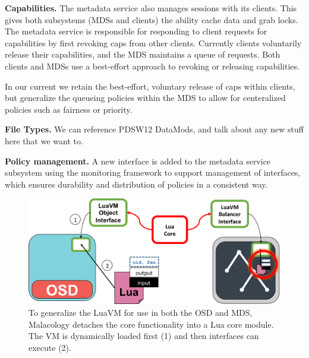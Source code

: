 \documentclass[10pt,twocolumn]{article}
\begin{document}
{\bf Capabilities.}
The metadata service also manages sessions with its clients. This gives both
subsystems (MDSs and clients) the ability cache data and grab locks. The
metadata service is responsible for responding to client requests for
capabilities by first revoking caps from other clients. Currently clients
voluntarily release their capabilities, and the MDS maintains a queue of
requests.  Both clients and MDSs use a best-effort approach to revoking or
releasing capabilities.

In our current we retain the best-effort, voluntary release of caps within
clients, but generalize the queueing policies within the MDS to allow for
centeralized policies such as fairness or priority.

{\bf File Types.}
We can reference PDSW12 DataMods, and talk about any new stuff here that we
want to.

{\bf Policy management.} A new interface is added to the metadata service
subsystem using the monitoring framework to support management of interfaces,
which ensures durability and distribution of policies in a consistent way.

\begin{figure}[h]
\centering
\includegraphics{figures/cls-osd-mds.png}
\caption{To generalize the LuaVM for use in both the OSD and MDS,
Malacology detaches the core functionality into a Lua core module. The
VM is dynamically loaded first (1) and then interfaces can execute (2).
\label{fig:cls-osd-mds}}
\end{figure}

\end{document}
